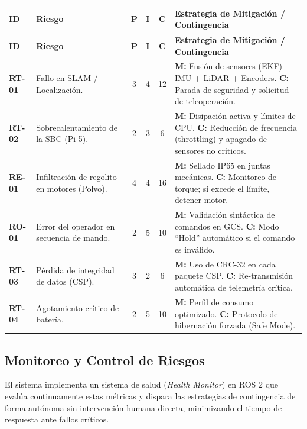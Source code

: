 \begin{longtable}{|l|p{4cm}|c|c|c|p{5.5cm}|}
    \hline
    \rowcolor{AgencyBlue!20} \textbf{ID} & \textbf{Riesgo} & \textbf{P} & \textbf{I} & \textbf{C} & \textbf{Estrategia de Mitigación / Contingencia} \\ \hline
    \endfirsthead
    \hline
    \rowcolor{AgencyBlue!20} \textbf{ID} & \textbf{Riesgo} & \textbf{P} & \textbf{I} & \textbf{C} & \textbf{Estrategia de Mitigación / Contingencia} \\ \hline
    \endhead
    \textbf{RT-01} & Fallo en SLAM / Localización. & 3 & 4 & 12 & \textbf{M:} Fusión de sensores (EKF) IMU + LiDAR + Encoders. \newline \textbf{C:} Parada de seguridad y solicitud de teleoperación. \\ \hline
    \textbf{RT-02} & Sobrecalentamiento de la SBC (Pi 5). & 2 & 3 & 6 & \textbf{M:} Disipación activa y límites de CPU. \newline \textbf{C:} Reducción de frecuencia (throttling) y apagado de sensores no críticos. \\ \hline
    \textbf{RE-01} & Infiltración de regolito en motores (Polvo). & 4 & 4 & 16 & \textbf{M:} Sellado IP65 en juntas mecánicas. \newline \textbf{C:} Monitoreo de torque; si excede el límite, detener motor. \\ \hline
    \textbf{RO-01} & Error del operador en secuencia de mando. & 2 & 5 & 10 & \textbf{M:} Validación sintáctica de comandos en GCS. \newline \textbf{C:} Modo ``Hold'' automático si el comando es inválido. \\ \hline
    \textbf{RT-03} & Pérdida de integridad de datos (CSP). & 3 & 2 & 6 & \textbf{M:} Uso de CRC-32 en cada paquete CSP. \newline \textbf{C:} Re-transmisión automática de telemetría crítica. \\ \hline
    \textbf{RT-04} & Agotamiento crítico de batería. & 2 & 5 & 10 & \textbf{M:} Perfil de consumo optimizado. \newline \textbf{C:} Protocolo de hibernación forzada (Safe Mode). \\ \hline
\end{longtable}

\subsection{Monitoreo y Control de Riesgos}
El sistema implementa un sistema de salud (\textit{Health Monitor}) en ROS 2 que evalúa continuamente estas métricas y dispara las estrategias de contingencia de forma autónoma sin intervención humana directa, minimizando el tiempo de respuesta ante fallos críticos.

